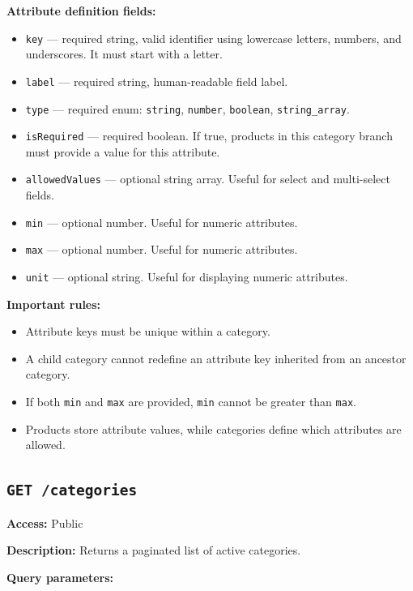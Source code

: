 \textbf{Attribute definition fields:}

\begin{itemize}
    \item \texttt{key} --- required string, valid identifier using lowercase letters, numbers, and underscores. It must start with a letter.
    \item \texttt{label} --- required string, human-readable field label.
    \item \texttt{type} --- required enum: \texttt{string}, \texttt{number}, \texttt{boolean}, \texttt{string\_array}.
    \item \texttt{isRequired} --- required boolean. If true, products in this category branch must provide a value for this attribute.
    \item \texttt{allowedValues} --- optional string array. Useful for select and multi-select fields.
    \item \texttt{min} --- optional number. Useful for numeric attributes.
    \item \texttt{max} --- optional number. Useful for numeric attributes.
    \item \texttt{unit} --- optional string. Useful for displaying numeric attributes.
\end{itemize}

\textbf{Important rules:}

\begin{itemize}
    \item Attribute keys must be unique within a category.
    \item A child category cannot redefine an attribute key inherited from an ancestor category.
    \item If both \texttt{min} and \texttt{max} are provided, \texttt{min} cannot be greater than \texttt{max}.
    \item Products store attribute values, while categories define which attributes are allowed.
\end{itemize}

\subsection{\texttt{GET /categories}}

\textbf{Access:} Public

\textbf{Description:} Returns a paginated list of active categories.

\textbf{Query parameters:}

